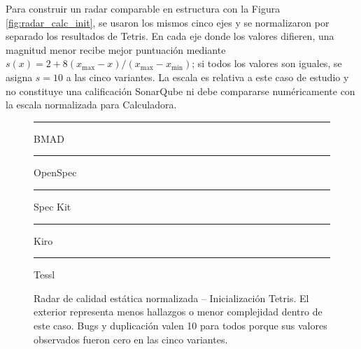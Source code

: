 Para construir un radar comparable en estructura con la Figura \ref{fig:radar_calc_init}, se usaron los mismos cinco ejes y se normalizaron por separado los resultados de Tetris. En cada eje donde los valores difieren, una magnitud menor recibe mejor puntuación mediante $s(x)=2+8(x_{\max}-x)/(x_{\max}-x_{\min})$; si todos los valores son iguales, se asigna $s=10$ a las cinco variantes. La escala es relativa a este caso de estudio y no constituye una calificación SonarQube ni debe compararse numéricamente con la escala normalizada para Calculadora.

\begin{figure}[H]
\centering
{}
\par\smallskip
{\footnotesize
\textcolor{vdarkblue}{\rule[0.5ex]{0.35cm}{1.3pt}} BMAD\quad
\textcolor{darkblue}{\rule[0.5ex]{0.35cm}{1.3pt}} OpenSpec\quad
\textcolor{blue}{\rule[0.5ex]{0.35cm}{1.3pt}} Spec Kit\quad
\textcolor{purple}{\rule[0.5ex]{0.35cm}{1.3pt}} Kiro\quad
\textcolor{lightblue}{\rule[0.5ex]{0.35cm}{1.3pt}} Tessl}
\caption{Radar de calidad estática normalizada -- Inicialización Tetris. El exterior representa menos hallazgos o menor complejidad dentro de este caso. Bugs y duplicación valen 10 para todos porque sus valores observados fueron cero en las cinco variantes.}
\label{fig:radar_tetris_init}
\end{figure}

